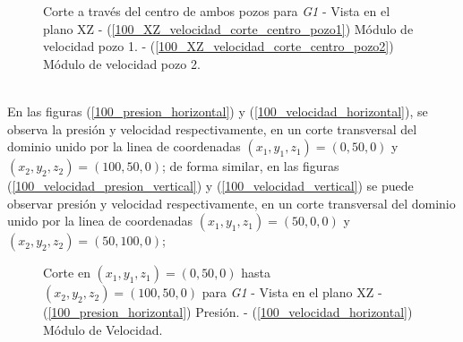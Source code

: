 \documentclass[10pt,a4paper,final]{article}
\begin{document}
\begin{figure}[tbhp]
    \caption{Corte a través del centro de ambos pozos para \emph{G1} - Vista en el plano XZ - (\ref{100_XZ_velocidad_corte_centro_pozo1}) Módulo de velocidad pozo 1. - (\ref{100_XZ_velocidad_corte_centro_pozo2}) Módulo de velocidad pozo 2.}
   \label{100_XZ_velocidad_corte_centro_pozos}                %
\end{figure}
%
\\
En las figuras (\ref{100_presion_horizontal}) y (\ref{100_velocidad_horizontal}), se observa la presión y velocidad respectivamente, en un corte transversal del dominio unido por la linea de coordenadas $(x_1,y_1,z_1)=(0,50,0)$ y $(x_2,y_2,z_2)=(100,50,0)$; de forma similar, en las figuras (\ref{100_velocidad_presion_vertical}) y (\ref{100_velocidad_vertical}) se puede observar presión y velocidad respectivamente, en un corte transversal del dominio unido por la linea de coordenadas $(x_1,y_1,z_1)=(50,0,0)$ y $(x_2,y_2,z_2)=(50,100,0)$;
\begin{figure}[tbhp]
   \centering
   \hspace{0.1\linewidth}
    \caption{Corte en $(x_1,y_1,z_1)=(0,50,0)$ hasta $(x_2,y_2,z_2)=(100,50,0)$ para \emph{G1} - Vista en el plano XZ - (\ref{100_presion_horizontal}) Presión. - (\ref{100_velocidad_horizontal}) Módulo de Velocidad.}
   \label{100_velocidad_presion_horizontal}                %
\end{figure}
\end{document}
